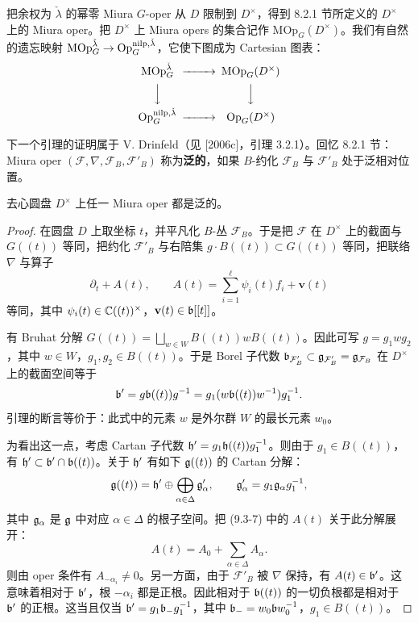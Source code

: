 把余权为 $\check\lambda$ 的幂零 Miura $G$-oper 从 $D$ 限制到 $D^\times$，得到 8.2.1 节所定义的 $D^\times$ 上的 Miura oper。把 $D^\times$ 上 Miura opers 的集合记作 $\mathrm{MOp}_G(D^\times)$。我们有自然的遗忘映射 $\mathrm{MOp}^{\check\lambda}_G\to\operatorname{Op}^{\mathrm{nilp},\check\lambda}_G$，它使下图成为 Cartesian 图表：
\[
\begin{CD}
\mathrm{MOp}^{\check\lambda}_G @>>> \mathrm{MOp}_G(D^\times)\\
@VVV @VVV\\
\Op^{\mathrm{nilp},\check\lambda}_G @>>> \Op_G(D^\times)
\end{CD}
\]

下一个引理的证明属于 V. Drinfeld（见 [2006c]，引理 3.2.1）。回忆 8.2.1 节：Miura oper $(\mathcal{F},\nabla,\mathcal{F}_B,\mathcal{F}'_B)$ 称为\textbf{泛的}，如果 $B$-约化 $\mathcal{F}_B$ 与 $\mathcal{F}'_B$ 处于泛相对位置。

\begin{lemma}
去心圆盘 $D^\times$ 上任一 Miura oper 都是泛的。
\end{lemma}

\begin{proof}
在圆盘 $D$ 上取坐标 $t$，并平凡化 $B$-丛 $\mathcal{F}_B$。于是把 $\mathcal{F}$ 在 $D^\times$ 上的截面与 $G((t))$ 等同，把约化 $\mathcal{F}'_B$ 与右陪集 $g\cdot B((t))\subset G((t))$ 等同，把联络 $\nabla$ 与算子
\begin{equation}
\partial_t + A(t),\qquad A(t) = \sum_{i=1}^{\ell}\psi_i(t)f_i + \mathbf{v}(t)
\tag{9.3-7}
\end{equation}
等同，其中 $\psi_i(t)\in\mathbb{C}((t))^\times$，$\mathbf{v}(t)\in\mathfrak{b}[[t]]$。

有 Bruhat 分解 $G((t)) = \bigsqcup_{w\in W}B((t))wB((t))$。因此可写 $g = g_1wg_2$，其中 $w\in W$，$g_1,g_2\in B((t))$。于是 Borel 子代数 $\mathfrak{b}_{\mathcal{F}'_B}\subset\mathfrak{g}_{\mathcal{F}'_B} = \mathfrak{g}_{\mathcal{F}_B}$ 在 $D^\times$ 上的截面空间等于
\[
\mathfrak{b}' = g\mathfrak{b}((t))g^{-1} = g_1(w\mathfrak{b}((t))w^{-1})g_1^{-1}.
\]
引理的断言等价于：此式中的元素 $w$ 是外尔群 $W$ 的最长元素 $w_0$。

为看出这一点，考虑 Cartan 子代数 $\mathfrak{h}' = g_1\mathfrak{h}((t))g_1^{-1}$。则由于 $g_1\in B((t))$，有 $\mathfrak{h}'\subset\mathfrak{b}'\cap\mathfrak{b}((t))$。关于 $\mathfrak{h}'$ 有如下 $\mathfrak{g}((t))$ 的 Cartan 分解：
\[
\mathfrak{g}((t)) = \mathfrak{h}'\oplus\bigoplus_{\alpha\in\Delta}\mathfrak{g}'_\alpha,\qquad \mathfrak{g}'_\alpha = g_1\mathfrak{g}_\alpha g_1^{-1},
\]
其中 $\mathfrak{g}_\alpha$ 是 $\mathfrak{g}$ 中对应 $\alpha\in\Delta$ 的根子空间。把 (9.3-7) 中的 $A(t)$ 关于此分解展开：
\[
A(t) = A_0 + \sum_{\alpha\in\Delta}A_\alpha.
\]
则由 oper 条件有 $A_{-\alpha_i}\ne 0$。另一方面，由于 $\mathcal{F}'_B$ 被 $\nabla$ 保持，有 $A(t)\in\mathfrak{b}'$。这意味着相对于 $\mathfrak{b}'$，根 $-\alpha_i$ 都是正根。因此相对于 $\mathfrak{b}((t))$ 的一切负根都是相对于 $\mathfrak{b}'$ 的正根。这当且仅当 $\mathfrak{b}' = g_1\mathfrak{b}_-g_1^{-1}$，其中 $\mathfrak{b}_- = w_0\mathfrak{b} w_0^{-1}$，$g_1\in B((t))$。
\end{proof}

